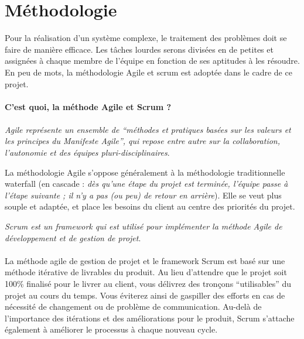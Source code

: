        
        \section{Méthodologie}
        Pour la réalisation d'un système complexe, le traitement des problèmes doit se faire 
        de manière efficace. Les tâches lourdes serons divisées en de petites et assignées 
        à chaque membre de l'équipe  en fonction de ses aptitudes à les résoudre. En peu de mots,
        la méthodologie Agile et scrum est adoptée dans le cadre de ce projet.

        
        \paragraph{C’est quoi, la méthode Agile et Scrum ?}
        \paragraph{}
        \textit{Agile représente un ensemble de “méthodes et pratiques basées sur 
        les valeurs et les principes du Manifeste Agile”, qui repose entre autre sur 
        la collaboration, l’autonomie et des équipes pluri-disciplinaires}\cite{Littlefield2017}.
        \par
        La méthodologie Agile s'oppose généralement à la méthodologie traditionnelle waterfall (en cascade :
        \textit{dès qu'une étape du projet est terminée, l'équipe passe à l'étape suivante ; il n'y a pas (ou peu) 
        de retour en arrière}\cite{2017}). Elle se veut plus souple 
        et adaptée, et place les besoins du client au centre des priorités du projet.
        \par
        \textit{Scrum est un framework qui est utilisé pour implémenter la méthode 
        Agile de développement et de gestion de projet}\cite{Littlefield2017}.

        \paragraph{}
        La méthode agile de gestion de projet et le framework Scrum est basé sur une méthode 
        itérative de livrables du produit. Au lieu d’attendre que le projet soit 100\% finalisé 
        pour le livrer au client, vous délivrez des tronçons “utilisables” du projet au cours du 
        temps. Vous éviterez ainsi de gaspiller des efforts en cas de nécessité de changement ou 
        de problème de communication. Au-delà de l’importance des itérations et des améliorations 
        pour le produit, Scrum s’attache également à améliorer le processus à chaque nouveau cycle.
